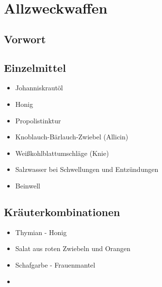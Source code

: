 \chapter{Allzweckwaffen}


\section{Vorwort}

\lipsum[1-5]
\newpage


\section{Einzelmittel}

\begin{itemize}
	\item Johanniskrautöl
	\item Honig
	\item Propolistinktur
	\item Knoblauch-Bärlauch-Zwiebel (Allicin)
	\item Weißkohlblattumschläge (Knie)
	\item Salzwasser bei Schwellungen und Entzündungen
	\item Beinwell
\end{itemize}





\section{Kräuterkombinationen}

\begin{itemize}
	\item Thymian - Honig
	\item Salat aus roten Zwiebeln und Orangen
	\item Schafgarbe - Frauenmantel
	\item 
\end{itemize}